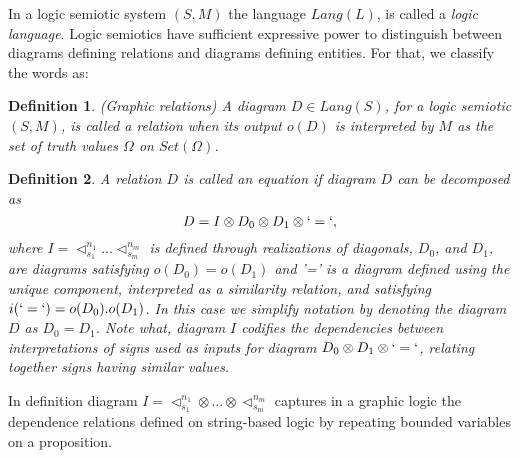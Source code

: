 \documentclass[oribibl]{llncs}
\newtheorem{defn}{Definition}
\begin{document}
In a logic semiotic system $(S,M)$ the language $Lang(L)$, is called a
\emph{logic language}. Logic semiotics have sufficient expressive power to distinguish between diagrams defining relations and diagrams defining entities. For that, we classify the words as:

\begin{defn}(Graphic relations)
A diagram $D\in Lang(S)$, for a logic semiotic $(S,M)$, is called a \emph{relation}
when its output $o(D)$ is interpreted by $M$ as the set of truth values $\Omega$ on $Set(\Omega)$.
\end{defn}
\begin{defn}
A relation $D$ is called an \emph{equation} if diagram $D$ can be decomposed
as \[D=I\otimes D_0\otimes D_1\otimes \lq=\lq,\] where $I=\lhd^{n_1}_{s_1} \ldots
\lhd^{n_m}_{s_m}$ is defined through realizations of diagonals,
$D_0$, and $D_1$, are diagrams satisfying $o(D_0)=o(D_1)$ and '=' is a
diagram defined using the unique component, interpreted as a similarity relation, and
satisfying ${i(\lq=\lq)=o(D_0).o(D_1)}$. In this case we simplify notation by denoting the diagram $D$
 as $D_0=D_1$. Note what, diagram $I$ codifies the dependencies between interpretations of signs used as inputs for diagram $D_0\otimes D_1\otimes \lq=\lq$, relating together signs having similar values.
\end{defn}
In definition diagram $I=\lhd^{n_1}_{s_1} \otimes\ldots\otimes\lhd^{n_m}_{s_m}$ captures in a graphic logic the dependence relations defined on string-based logic by repeating bounded variables on a proposition.
\end{document}
